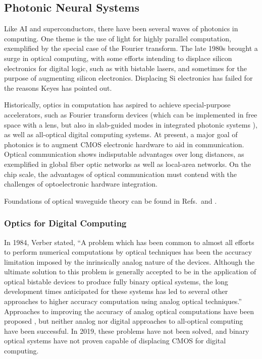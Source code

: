 \subsection{\label{sec:photonic_neural_systems}Photonic Neural Systems}
Like AI and superconductors, there have been several waves of photonics in computing. One theme is the use of light for highly parallel computation, exemplified by the special case of the Fourier transform. The late 1980s brought a surge in optical computing, with some efforts intending to displace silicon electronics for digital logic, such as with bistable lasers, and sometimes for the purpose of augmenting silicon electronics. Displacing Si electronics has failed for the reasons Keyes has pointed out.

\vspace{3em}
Historically, optics in computation has aspired to achieve special-purpose accelerators, such as Fourier transform devices (which can be implemented in free space with a lens, but also in slab-guided modes in integrated photonic systems \cite{shha1968,anbo1977}), as well as all-optical digital computing systems. At present, a major goal of photonics is to augment CMOS electronic hardware to aid in communication. Optical communication shows indisputable advantages over long distances, as exemplified in global fiber optic networks as well as local-area networks. On the chip scale, the advantages of optical communication must contend with the challenges of optoelectronic hardware integration. 

\vspace{3em}
Foundations of optical waveguide theory can be found in Refs.\,\cite{snlo1983} and \cite{hu2009}.

\subsubsection{Optics for Digital Computing}
\cite{absm1982}

\cite{ve1984} In 1984, Verber stated, ``A problem which has been common to almost all efforts to perform numerical computations by optical techniques has been the accuracy limitation imposed by the inrinsically analog nature of the devices. Although the ultimate solution to this problem is generally accepted to be in the application of optical bistable devices to produce fully binary optical systems, the long development times anticipated for these systems has led to several other approaches to higher accuracy computation using analog optical techniques.'' Approaches to improving the accuracy of analog optical computations have been proposed \cite{psca1980,arha1984}, but neither analog nor digital approaches to all-optical computing have been successful. In 2019, these problems have not been solved, and binary optical systems have not proven capable of displacing CMOS for digital computing. 

